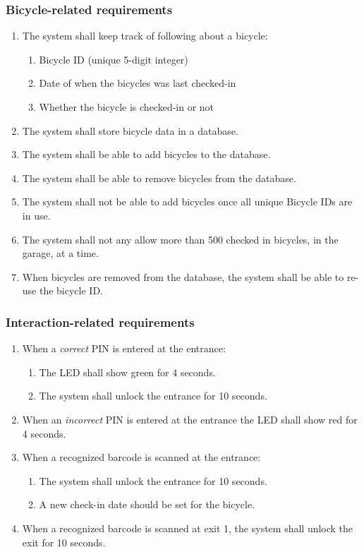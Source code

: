 \documentclass[12pt,titlepage,bibliography=totoc]{article}
\begin{document}
\subsubsection{Bicycle-related requirements}
\begin{enumerate}
	\item The system shall keep track of following about a bicycle:
	\begin{enumerate}
		\item Bicycle ID (unique 5-digit integer)
		\item Date of when the bicycles was last checked-in
		\item Whether the bicycle is checked-in or not
	\end{enumerate}
	\item The system shall store bicycle data in a database.
	\item The system shall be able to add bicycles to the database.
	\item The system shall be able to remove bicycles from the database.
	\item The system shall not be able to add bicycles once all unique Bicycle IDs are in use.
	\item The system shall not any allow more than 500 checked in bicycles, in the garage, at a time.
	\item When bicycles are removed from the database, the system shall be able to re-use the bicycle ID.
\end{enumerate}
\subsubsection{Interaction-related requirements}
\begin{enumerate}
	\item When a \emph{correct} PIN is entered at the entrance:
		\begin{enumerate}
			\item The LED shall show green for 4 seconds.
			\item The system shall unlock the entrance for 10 seconds.
		\end{enumerate}
	\item When an \emph{incorrect} PIN is entered at the entrance the LED shall show red for 4 seconds.
	\item When a recognized barcode is scanned at the entrance:
		\begin{enumerate}
			\item The system shall unlock the entrance for 10 seconds.
			\item A new check-in date should be set for the bicycle.
		\end{enumerate}
	\item When a recognized barcode is scanned at exit 1, the system shall unlock the exit for 10 seconds.
\end{enumerate}
\end{document}
